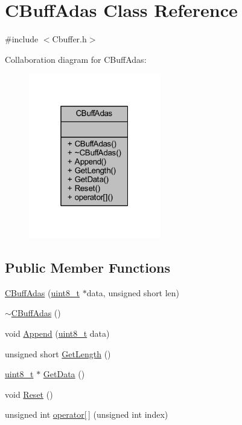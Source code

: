 \hypertarget{class_c_buff_adas}{}\section{C\+Buff\+Adas Class Reference}
\label{class_c_buff_adas}


{\ttfamily \#include $<$Cbuffer.\+h$>$}



Collaboration diagram for C\+Buff\+Adas\+:
\nopagebreak
\begin{figure}[H]
\begin{center}
\leavevmode
\includegraphics[width=163pt]{class_c_buff_adas__coll__graph}
\end{center}
\end{figure}
\subsection*{Public Member Functions}
\begin{DoxyCompactItemize}
\item 
\mbox{\hyperlink{class_c_buff_adas_afb14758fc413199161d48963a83edadb}{C\+Buff\+Adas}} (\mbox{\hyperlink{_a_d_a_s___types_8h_aba7bc1797add20fe3efdf37ced1182c5}{uint8\+\_\+t}} $\ast$data, unsigned short len)
\item 
\mbox{\hyperlink{class_c_buff_adas_a55af513577ba8522492fff4db85da247}{$\sim$\+C\+Buff\+Adas}} ()
\item 
void \mbox{\hyperlink{class_c_buff_adas_ad131824caddc2ee1b90a629e4c30f215}{Append}} (\mbox{\hyperlink{_a_d_a_s___types_8h_aba7bc1797add20fe3efdf37ced1182c5}{uint8\+\_\+t}} data)
\item 
unsigned short \mbox{\hyperlink{class_c_buff_adas_aa17f6536175e0aafe8ab7b307decf279}{Get\+Length}} ()
\item 
\mbox{\hyperlink{_a_d_a_s___types_8h_aba7bc1797add20fe3efdf37ced1182c5}{uint8\+\_\+t}} $\ast$ \mbox{\hyperlink{class_c_buff_adas_a56fdcdc9766874d3a6fef04119ee91f9}{Get\+Data}} ()
\item 
void \mbox{\hyperlink{class_c_buff_adas_a2ff1ee5f1dfa56117d76b17027d7b7e8}{Reset}} ()
\item 
unsigned int \mbox{\hyperlink{class_c_buff_adas_aedceb4a4bcc47b6e4150a821f0494862}{operator\mbox{[}$\,$\mbox{]}}} (unsigned int index)
\end{DoxyCompactItemize}


